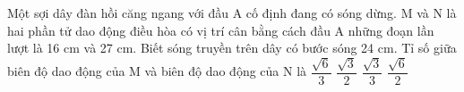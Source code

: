 \begin{vidu}%
 Một sợi dây đàn hồi căng ngang với đầu A cố định đang có sóng dừng. M và N là hai phần tử dao động điều hòa có vị trí cân bằng cách đầu A những đoạn lần lượt là 16 cm và 27 cm. Biết sóng truyền trên dây có bước sóng 24 cm. Tỉ số giữa biên độ dao động của M và biên độ dao động của N là
\choice
{$\dfrac{\sqrt{6}}{3}$}
{$\dfrac{\sqrt{3}}{2}$}
{$\dfrac{\sqrt{3}}{3}$}
{\True $\dfrac{\sqrt{6}}{2}$}
\end{vidu} 

